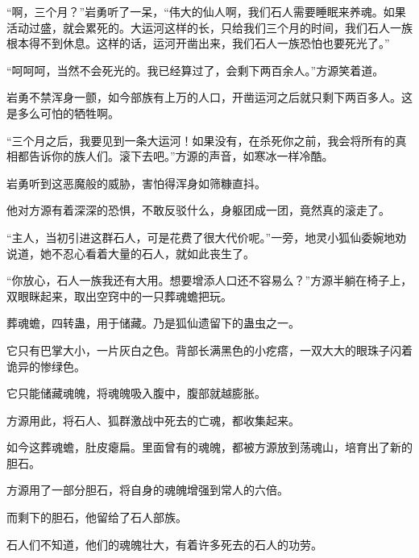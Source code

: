 \begin{this_body}
“啊，三个月？”岩勇听了一呆，“伟大的仙人啊，我们石人需要睡眠来养魂。如果活动过盛，就会累死的。大运河这样的长，只给我们三个月的时间，我们石人一族根本得不到休息。这样的话，运河开凿出来，我们石人一族恐怕也要死光了。”

“呵呵呵，当然不会死光的。我已经算过了，会剩下两百余人。”方源笑着道。

岩勇不禁浑身一颤，如今部族有上万的人口，开凿运河之后就只剩下两百多人。这是多么可怕的牺牲啊。

“三个月之后，我要见到一条大运河！如果没有，在杀死你之前，我会将所有的真相都告诉你的族人们。滚下去吧。”方源的声音，如寒冰一样冷酷。

岩勇听到这恶魔般的威胁，害怕得浑身如筛糠直抖。

他对方源有着深深的恐惧，不敢反驳什么，身躯团成一团，竟然真的滚走了。

“主人，当初引进这群石人，可是花费了很大代价呢。”一旁，地灵小狐仙委婉地劝说道，她不忍心看着大量的石人，就如此丧生了。

“你放心，石人一族我还有大用。想要增添人口还不容易么？”方源半躺在椅子上，双眼眯起来，取出空窍中的一只葬魂蟾把玩。

葬魂蟾，四转蛊，用于储藏。乃是狐仙遗留下的蛊虫之一。

它只有巴掌大小，一片灰白之色。背部长满黑色的小疙瘩，一双大大的眼珠子闪着诡异的惨绿色。

它只能储藏魂魄，将魂魄吸入腹中，腹部就越膨胀。

方源用此，将石人、狐群激战中死去的亡魂，都收集起来。

如今这葬魂蟾，肚皮瘪扁。里面曾有的魂魄，都被方源放到荡魂山，培育出了新的胆石。

方源用了一部分胆石，将自身的魂魄增强到常人的六倍。

而剩下的胆石，他留给了石人部族。

石人们不知道，他们的魂魄壮大，有着许多死去的石人的功劳。

\end{this_body}

